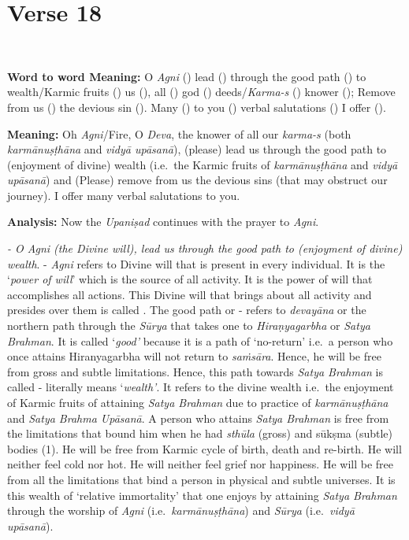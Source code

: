 \chapter{Verse 18}

\begin{moolashloka}
\\
\end{moolashloka}

\textbf{Word to word Meaning:} O \emph{Agni} () lead () through the good path () to wealth/Karmic fruits () us (), all () god () deeds/\emph{Karma-s} () knower (); Remove from us () the devious sin (). Many () to you () verbal salutations () I offer ().

\textbf{Meaning:} Oh \emph{Agni}/Fire, O \emph{Deva}, the knower of all our \emph{karma-s} (both \emph{karmānuṣṭhāna} and \emph{vidyā upāsanā}), (please) lead us through the good path to (enjoyment of divine) wealth (i.e.\ the Karmic fruits of \emph{karmānuṣṭhāna} and \emph{vidyā upāsanā}) and (Please) remove from us the devious sins (that may obstruct our journey). I offer many verbal salutations to you.

\textbf{Analysis:} Now the \emph{Upaniṣad} continues with the prayer to \emph{Agni}.

\emph{- O Agni (the Divine will), lead us through the good path to (enjoyment of divine) wealth}.  - \emph{Agni} refers to Divine will that is present in every individual. It is the `\emph{power of will}' which is the source of all activity. It is the power of will that accomplishes all actions. This Divine will that brings about all activity and presides over them is called . The good path or - refers to \emph{devayāna} or the northern path through the \emph{Sūrya} that takes one to \emph{Hiraṇyagarbha} or \emph{Satya Brahman}. It is called `\emph{good'} because it is a path of `no-return' i.e.\ a person who once attains Hiranyagarbha will not return to \emph{saṁsāra}. Hence, he will be free from gross and subtle limitations. Hence, this path towards \emph{Satya Brahman} is called - literally means `\emph{wealth'}. It refers to the divine wealth i.e.\ the enjoyment of Karmic fruits of attaining \emph{Satya Brahman} due to practice of \emph{karmānuṣṭhāna} and \emph{Satya Brahma Upāsanā}. A person who attains \emph{Satya Brahman} is free from the limitations that bound him when he had \emph{sthūla} (gross) and sūkṣma (subtle) bodies (1). He will be free from Karmic cycle of birth, death and re-birth. He will neither feel cold nor hot. He will neither feel grief nor happiness. He will be free from all the limitations that bind a person in physical and subtle universes. It is this wealth of `relative immortality' that one enjoys by attaining \emph{Satya Brahman} through the worship of \emph{Agni} (i.e.\ \emph{karmānuṣṭhāna}) and \emph{Sūrya} (i.e.\ \emph{vidyā upāsanā}).

